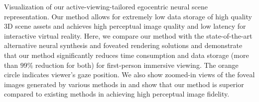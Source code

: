 \begin{teaserfigure}
  \centering
 {%
 Visualization of our active-viewing-tailored egocentric neural scene representation.
 Our method allows for extremely low data storage of high quality 3D scene assets and achieves high perceptual image quality and low latency for interactive virtual reality. Here, we compare our method with the state-of-the-art alternative neural synthesis \protect\cite{mildenhall2020nerf} and foveated rendering solutions \cite{perry2002gaze,Patney:2016:TFR} and demonstrate that our method significantly reduces time consumption and data storage (more than $99\%$ reduction for both) for first-person immersive viewing. The orange circle indicates viewer's gaze position. We also show zoomed-in views of the foveal images generated by various methods in  and show that our method is superior compared to existing methods in achieving high perceptual image fidelity.
}
\end{teaserfigure}
